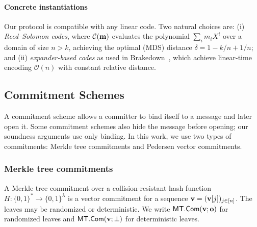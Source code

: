\paragraph{Concrete instantiations}
Our protocol is compatible with any linear code.
Two natural choices are: (i) \emph{Reed--Solomon codes}, where $\mathcal{C}(\mathbf{m})$ evaluates the polynomial $\sum_i m_i X^i$ over a domain of size $n > k$, achieving the optimal (MDS) distance $\delta = 1 - k/n + 1/n$; and (ii) \emph{expander-based codes} as used in Brakedown~\cite{golovnev2023brakedown}, which achieve linear-time encoding $\mathcal{O}(n)$ with constant relative distance.


\subsection{Commitment Schemes}
\label{sec:prelim-commitments}
A commitment scheme allows a committer to bind itself to a message and later
open it. Some commitment schemes also hide the message before opening; our
soundness arguments use only binding. In this work, we use two types of
commitments: Merkle tree commitments and Pedersen vector commitments.

\subsubsection{Merkle tree commitments}

A Merkle tree commitment over a collision-resistant hash function $H: \{0,1\}^* \to \{0,1\}^\lambda$ is a vector commitment for a sequence $\mathbf{v}=(\mathbf{v}[j])_{j\in[n]}$.
The leaves may be randomized or deterministic. We write
\(\textsf{MT.Com}(\mathbf{v};\mathbf{o})\) for randomized leaves and
\(\textsf{MT.Com}(\mathbf{v};\bot)\) for deterministic leaves.

